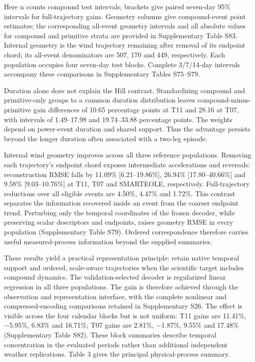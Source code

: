 \documentclass[preprint,12pt]{elsarticle}
\begin{document}
Here n counts compound test intervals; brackets give paired seven-day 95\% intervals for full-trajectory gains. Geometry columns give compound-event point estimates; the corresponding all-event geometry intervals and all absolute values for compound and primitive strata are provided in Supplementary Table S83. Internal geometry is the wind trajectory remaining after removal of its endpoint chord; its all-event denominators are 507, 170 and 449, respectively. Each population occupies four seven-day test blocks. Complete 3/7/14-day intervals accompany these comparisons in Supplementary Tables S75--S79.

Duration alone does not explain the Hill contrast. Standardizing compound and primitive-only groups to a common duration distribution leaves compound-minus-primitive gain differences of 10.65 percentage points at T11 and 28.16 at T07, with intervals of 1.49--17.98 and 19.74--33.88 percentage points. The weights depend on power-event duration and shared support. Thus the advantage persists beyond the longer duration often associated with a two-leg episode.

Internal wind geometry improves across all three reference populations. Removing each trajectory's endpoint chord exposes intermediate accelerations and reversals: reconstruction RMSE falls by 11.09\% {[}6.21--19.86\%{]}, 26.94\% {[}17.80--40.66\%{]} and 9.58\% {[}9.03--10.76\%{]} at T11, T07 and SMARTEOLE, respectively. Full-trajectory reductions over all eligible events are 4.50\%, 4.47\% and 1.72\%. This contrast separates the information recovered inside an event from the coarser endpoint trend. Perturbing only the temporal coordinates of the frozen decoder, while preserving scalar descriptors and endpoints, raises geometry RMSE in every population (Supplementary Table S79). Ordered correspondence therefore carries useful measured-process information beyond the supplied summaries.

These results yield a practical representation principle: retain native temporal support and ordered, scale-aware trajectories when the scientific target includes compound dynamics. The validation-selected decoder is regularized linear regression in all three populations. The gain is therefore achieved through the observation and representation interface, with the complete nonlinear and compressed-encoding comparisons retained in Supplementary S26. The effect is visible across the four calendar blocks but is not uniform: T11 gains are 11.41\%, −5.95\%, 6.83\% and 16.71\%; T07 gains are 2.81\%, −1.87\%, 9.55\% and 17.48\% (Supplementary Table S82). These block summaries describe temporal concentration in the evaluated periods rather than additional independent weather replications. Table 3 gives the principal physical-process summary.
\end{document}
